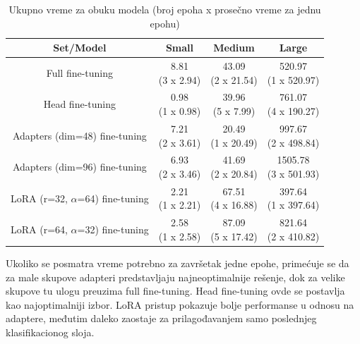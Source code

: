 \documentclass[12pt,oneside]{memoir}
\begin{document}
\begin{table}[h!]
	\centering
	\setlength{\tabcolsep}{12pt}
	\renewcommand{\arraystretch}{3}
	\begin{tabular}{|c|c|c|c|} %
		\hline
		Set/Model & Small & Medium & Large \\
		\hline
		Full fine-tuning & \makecell{8.81 \\ (3 x 2.94)} & \makecell{43.09 \\ (2 x 21.54)} & \makecell{ 520.97\\ (1 x 520.97)} \\ 
		\hline
		Head fine-tuning & \makecell{0.98 \\ (1 x 0.98)} & \makecell{39.96 \\ (5 x 7.99)} & \makecell{761.07 \\ (4 x 190.27)} \\ 
		\hline
		Adapters (dim=48) fine-tuning & \makecell{7.21 \\ (2 x 3.61)} & \makecell{ 20.49 \\ (1 x 20.49)} & \makecell{997.67 \\ (2 x 498.84)} \\ 
		\hline
		Adapters (dim=96) fine-tuning & \makecell{6.93 \\ (2 x 3.46)} & \makecell{ 41.69 \\ (2 x 20.84)} & \makecell{1505.78 \\ (3 x 501.93)} \\ 
		\hline
		LoRA (r=32, \(\alpha\)=64) fine-tuning & \makecell{2.21 \\ (1 x 2.21)} & \makecell{67.51 \\ (4 x 16.88)} & \makecell{397.64 \\ (1 x 397.64)} \\ 
		\hline	
		LoRA (r=64, \(\alpha\)=32) fine-tuning & \makecell{2.58 \\ (1 x 2.58)} & \makecell{87.09 \\ (5 x 17.42)} & \makecell{821.64 \\ (2 x 410.82)} \\ 
		\hline		
	\end{tabular}
	\caption{Ukupno vreme za obuku modela (broj epoha x prosečno vreme za jednu epohu)}
	\label{tab:TimeComparison}
\end{table}

Ukoliko se posmatra vreme potrebno za završetak jedne epohe, primećuje se da za male skupove adapteri predstavljaju najneoptimalnije rešenje, dok za velike skupove tu ulogu preuzima full fine-tuning. Head fine-tuning ovde se postavlja kao najoptimalniji izbor. LoRA pristup pokazuje bolje performanse u odnosu na adaptere, međutim daleko zaostaje za prilagođavanjem samo poslednjeg klasifikacionog sloja.
\end{document}
